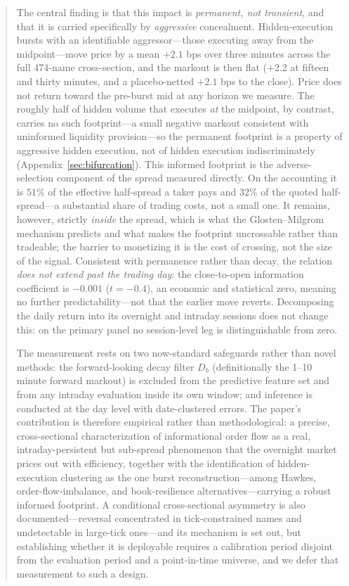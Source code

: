 \documentclass[11pt]{article}
\begin{document}
\begin{abstract}
The central finding is that this impact is \emph{permanent, not transient}, and that it is carried specifically by \emph{aggressive} concealment. Hidden-execution bursts with an identifiable aggressor---those executing away from the midpoint---move price by a mean $+2.1$ bps over three minutes across the full 474-name cross-section, and the markout is then flat ($+2.2$ at fifteen and thirty minutes, and a placebo-netted $+2.1$ bps to the close). Price does not return toward the pre-burst mid at any horizon we measure. The roughly half of hidden volume that executes \emph{at} the midpoint, by contrast, carries no such footprint---a small negative markout consistent with uninformed liquidity provision---so the permanent footprint is a property of aggressive hidden execution, not of hidden execution indiscriminately (Appendix~\ref{sec:bifurcation}). This informed footprint is the adverse-selection component of the spread measured directly. On the \citet{huangstoll1997} accounting it is $51\%$ of the effective half-spread a taker pays and $32\%$ of the quoted half-spread---a substantial share of trading costs, not a small one. It remains, however, strictly \emph{inside} the spread, which is what the Glosten--Milgrom mechanism predicts and what makes the footprint uncrossable rather than tradeable; the barrier to monetizing it is the cost of crossing, not the size of the signal. Consistent with permanence rather than decay, the relation \emph{does not extend past the trading day}: the close-to-open information coefficient is $-0.001$ ($t=-0.4$), an economic and statistical zero, meaning no further predictability---not that the earlier move reverts. Decomposing the daily return into its overnight and intraday sessions does not change this: on the primary panel no session-level leg is distinguishable from zero.

The measurement rests on two now-standard safeguards rather than novel methods: the forward-looking decay filter $D_b$ (definitionally the 1--10 minute forward markout) is excluded from the predictive feature set and from any intraday evaluation inside its own window; and inference is conducted at the day level with date-clustered errors. The paper's contribution is therefore empirical rather than methodological: a precise, cross-sectional characterization of informational order flow as a real, intraday-persistent but sub-spread phenomenon that the overnight market prices out with efficiency, together with the identification of hidden-execution clustering as the one burst reconstruction---among Hawkes, order-flow-imbalance, and book-resilience alternatives---carrying a robust informed footprint. A conditional cross-sectional asymmetry is also documented---reversal concentrated in tick-constrained names and undetectable in large-tick ones---and its mechanism is set out, but establishing whether it is deployable requires a calibration period disjoint from the evaluation period and a point-in-time universe, and we defer that measurement to such a design.
\end{abstract}
\end{document}
